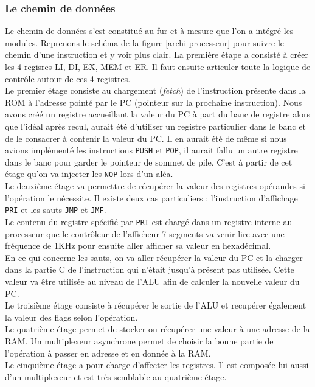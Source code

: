 \subsubsection*{Le chemin de données}

Le chemin de données s'est constitué au fur et à mesure que l'on a intégré les modules. Reprenons le schéma de la figure \ref{archi-processeur} pour suivre le chemin d'une instruction et y voir plus clair. La première étape a consisté à créer les 4 regisres LI, DI, EX, MEM et ER. Il faut ensuite articuler toute la logique de contrôle autour de ces 4 registres.\\

Le premier étage consiste au chargement (\textit{fetch}) de l'instruction présente dans la ROM à l'adresse pointé par le PC (pointeur sur la prochaine instruction). Nous avons créé un registre accueillant la valeur du PC à part du banc de registre alors que l'idéal après recul, aurait été d'utiliser un registre particulier dans le banc et de le consacrer à contenir la valeur du PC. Il en aurait été de même si nous avions implémenté les instructions \texttt{PUSH} et \texttt{POP}, il aurait fallu un autre registre dans le banc pour garder le pointeur de sommet de pile. C'est à partir de cet étage qu'on va injecter les \texttt{NOP} lors d'un aléa.\\

Le deuxième étage va permettre de récupérer la valeur des registres opérandes si l'opération le nécessite. Il existe deux cas particuliers : l'instruction d'affichage \texttt{PRI} et les sauts \texttt{JMP} et \texttt{JMF}.\\
Le contenu du registre spécifié par \texttt{PRI} est chargé dans un registre interne au processeur que le  contrôleur de l'afficheur 7 segments va venir lire avec une fréquence de 1KHz pour ensuite aller afficher sa valeur en hexadécimal.\\
En ce qui concerne les sauts, on va aller récupérer la valeur du PC et la charger dans la partie C de l'instruction qui n'était jusqu'à présent pas utilisée. Cette valeur va être utilisée au niveau de l'ALU afin de calculer la nouvelle valeur du PC.\\
 
Le troisième étage consiste à récupérer le sortie de l'ALU et recupérer également la valeur des flags selon l'opération.\\

Le quatrième étage permet de stocker ou récupérer une valeur à une adresse de la RAM. Un multiplexeur asynchrone permet de choisir la bonne partie de l'opération à passer en adresse et en donnée à la RAM.\\

Le cinquième étage a pour charge d'affecter les registres. Il est composée lui aussi d'un multiplexeur et est très semblable au quatrième étage.